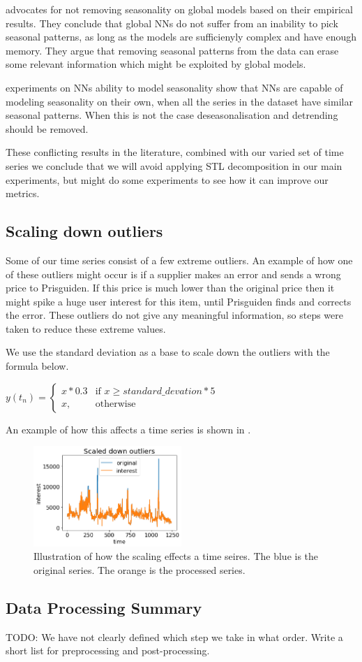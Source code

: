 \cite{Montero-Manso2021} advocates for not removing seasonality on global models based on their empirical results.
They conclude that global NNs do not suffer from an inability to pick seasonal patterns,
as long as the models are sufficienyly complex and have enough memory. They argue that removing
seasonal patterns from the data can erase some relevant information which might be exploited by global models.

\cite{Hewamalage2021} experiments on NNs ability to model seasonality show that NNs are capable of
modeling seasonality on their own, when all the series in the dataset have similar seasonal patterns.
When this is not the case deseasonalisation and detrending should be removed.

These conflicting results in the literature, combined with our varied set of time series
we conclude that we will avoid applying STL decomposition in our main experiments,
but might do some experiments to see how it can improve our metrics.

\subsection{Scaling down outliers}
\label{section:Data:Preprocessing:scale-down-outliers}
Some of our time series consist of a few extreme outliers. An example of
how one of these outliers might occur is if a supplier makes an error and sends
a wrong price to Prisguiden. If this price is much lower than the original price then
it might spike a huge user interest for this item, until Prisguiden finds and corrects the error.
These outliers do not give any meaningful information, so steps were taken to reduce these extreme values.

We use the standard deviation as a base to scale down the outliers with the formula below.

$y(t_n)=
  \begin{cases}
    x * 0.3 & \text{if } x\geq standard\_devation * 5 \\
    x,      & \text{otherwise}
  \end{cases}$

An example of how this affects a time series is shown in .
\begin{figure}[h!]
  \centering
  \includegraphics[width=0.5\textwidth]{./figs/code_generated/data_exploration/scaled_down_outliers.png}
  \hfill
  \caption{Illustration of how the scaling effects a time seires. The blue is the original series. The orange is the processed series.}
  \label{fig:illustration:scaled-down-outliers}
\end{figure}

\subsection{Data Processing Summary}
TODO: We have not clearly defined which step we take in what order.
Write a short list for preprocessing and post-processing.